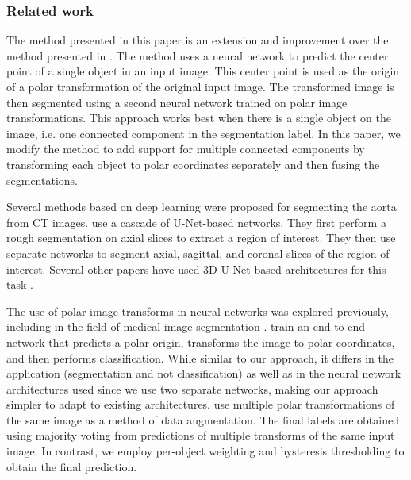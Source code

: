 \subsubsection{Related work}\label{related}


The method presented in this paper is an extension and improvement over the method presented in \cite{bencevicTrainingPolarImage2021}. The method uses a neural network to predict the center point of a single object in an input image. This center point is used as the origin of a polar transformation of the original input image. The transformed image is then segmented using a second neural network trained on polar image transformations. This approach works best when there is a single object on the image, i.e. one connected component in the segmentation label. In this paper, we modify the method to add support for multiple connected components by transforming each object to polar coordinates separately and then fusing the segmentations.

Several methods based on deep learning were proposed for segmenting the aorta from CT images. \citet{fantazzini3DAutomaticSegmentation2020} use a cascade of U-Net-based networks. They first perform a rough segmentation on axial slices to extract a region of interest. They then use separate networks to segment axial, sagittal, and coronal slices of the region of interest. Several other papers have used 3D U-Net-based architectures for this task \cite{yuThreeDimensionalDeepConvolutional2021, chenMultistageLearningSegmentation2021}.

The use of polar image transforms in neural networks was explored previously, including in the field of medical image segmentation \cite{liuDDNetCartesianpolarDualdomain2019a}. \citet{estevesPolarTransformerNetworks2018a} train an end-to-end network that predicts a polar origin, transforms the image to polar coordinates, and then performs classification. While similar to our approach, it differs in the application (segmentation and not classification) as well as in the neural network architectures used since we use two separate networks, making our approach simpler to adapt to existing architectures. \citet{salehinejadImageAugmentationUsing2018a} use multiple polar transformations of the same image as a method of data augmentation. The final labels are obtained using majority voting from predictions of multiple transforms of the same input image. In contrast, we employ per-object weighting and hysteresis thresholding to obtain the final prediction.

